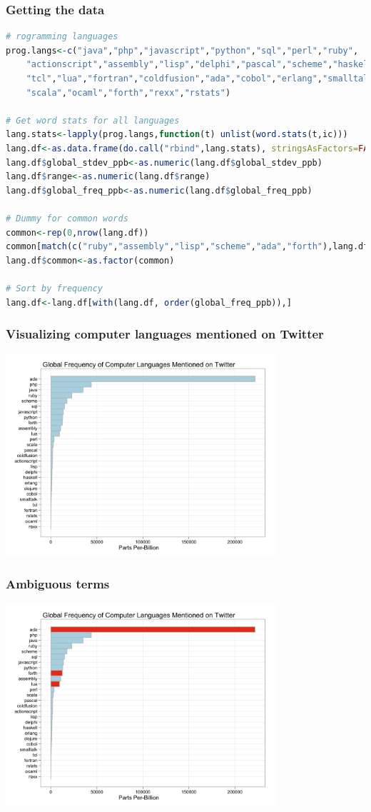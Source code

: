 \documentclass[xcolor=dvipsnames, 9pt,handout]{beamer}
\begin{document}
\begin{frame}[fragile]
    \frametitle{Getting the data}
    \scriptsize{\begin{lstlisting}[language=R]
# rogramming languages
prog.langs<-c("java","php","javascript","python","sql","perl","ruby",
    "actionscript","assembly","lisp","delphi","pascal","scheme","haskell",
    "tcl","lua","fortran","coldfusion","ada","cobol","erlang","smalltalk",
    "scala","ocaml","forth","rexx","rstats")
    
# Get word stats for all languages
lang.stats<-lapply(prog.langs,function(t) unlist(word.stats(t,ic)))
lang.df<-as.data.frame(do.call("rbind",lang.stats), stringsAsFactors=FALSE)
lang.df$global_stdev_ppb<-as.numeric(lang.df$global_stdev_ppb)
lang.df$range<-as.numeric(lang.df$range)
lang.df$global_freq_ppb<-as.numeric(lang.df$global_freq_ppb)

# Dummy for common words
common<-rep(0,nrow(lang.df))
common[match(c("ruby","assembly","lisp","scheme","ada","forth"),lang.df$tok)]<-1
lang.df$common<-as.factor(common)

# Sort by frequency
lang.df<-lang.df[with(lang.df, order(global_freq_ppb)),]
    \end{lstlisting}}
\end{frame}

\begin{frame}[fragile]
    \frametitle{Visualizing computer languages mentioned on Twitter}
    \includegraphics[width=10cm]{images/lang_pop1.png}
\end{frame}

\begin{frame}[fragile]
    \frametitle{Ambiguous terms}
    \includegraphics[width=10cm]{images/lang_pop2.png}
\end{frame}
\end{document}
